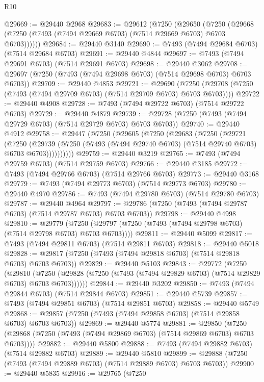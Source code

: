 \begin{lexlean}{R10}
\begin{coremodule}
@29669 := @29440 @2968
@29683 := @29612
    (@7250
      (@29650
        (@7250 (@29668 (@7250 (@7493 (@7494 @29669 @6703) (@7514 @29669 @6703) @6703 @6703))))))
@29684 := @29440 @3140
@29690 := @7493 (@7494 @29684 @6703) (@7514 @29684 @6703)
@29691 := @29440 @4844
@29697 := @7493 (@7494 @29691 @6703) (@7514 @29691 @6703)
@29698 := @29440 @3062
@29708 := @29697 (@7250 (@7493 (@7494 @29698 @6703) (@7514 @29698 @6703) @6703 @6703))
@29709 := @29440 @4853
@29721 := @29690
    (@7250 (@29708 (@7250 (@7493 (@7494 @29709 @6703) (@7514 @29709 @6703) @6703 @6703))))
@29722 := @29440 @4908
@29728 := @7493 (@7494 @29722 @6703) (@7514 @29722 @6703)
@29729 := @29440 @4879
@29739 := @29728 (@7250 (@7493 (@7494 @29729 @6703) (@7514 @29729 @6703) @6703 @6703))
@29740 := @29440 @4912
@29758 := @29447
    (@7250
      (@29605
        (@7250
          (@29683
            (@7250
              (@29721
                (@7250
                  (@29739
                    (@7250 (@7493 (@7494 @29740 @6703) (@7514 @29740 @6703) @6703 @6703))))))))))
@29759 := @29440 @3219
@29765 := @7493 (@7494 @29759 @6703) (@7514 @29759 @6703)
@29766 := @29440 @3185
@29772 := @7493 (@7494 @29766 @6703) (@7514 @29766 @6703)
@29773 := @29440 @3168
@29779 := @7493 (@7494 @29773 @6703) (@7514 @29773 @6703)
@29780 := @29440 @4970
@29786 := @7493 (@7494 @29780 @6703) (@7514 @29780 @6703)
@29787 := @29440 @4964
@29797 := @29786 (@7250 (@7493 (@7494 @29787 @6703) (@7514 @29787 @6703) @6703 @6703))
@29798 := @29440 @4998
@29810 := @29779
    (@7250 (@29797 (@7250 (@7493 (@7494 @29798 @6703) (@7514 @29798 @6703) @6703 @6703))))
@29811 := @29440 @5099
@29817 := @7493 (@7494 @29811 @6703) (@7514 @29811 @6703)
@29818 := @29440 @5018
@29828 := @29817 (@7250 (@7493 (@7494 @29818 @6703) (@7514 @29818 @6703) @6703 @6703))
@29829 := @29440 @5103
@29843 := @29772
    (@7250
      (@29810
        (@7250 (@29828 (@7250 (@7493 (@7494 @29829 @6703) (@7514 @29829 @6703) @6703 @6703))))))
@29844 := @29440 @3202
@29850 := @7493 (@7494 @29844 @6703) (@7514 @29844 @6703)
@29851 := @29440 @5739
@29857 := @7493 (@7494 @29851 @6703) (@7514 @29851 @6703)
@29858 := @29440 @5749
@29868 := @29857 (@7250 (@7493 (@7494 @29858 @6703) (@7514 @29858 @6703) @6703 @6703))
@29869 := @29440 @5774
@29881 := @29850
    (@7250 (@29868 (@7250 (@7493 (@7494 @29869 @6703) (@7514 @29869 @6703) @6703 @6703))))
@29882 := @29440 @5800
@29888 := @7493 (@7494 @29882 @6703) (@7514 @29882 @6703)
@29889 := @29440 @5810
@29899 := @29888 (@7250 (@7493 (@7494 @29889 @6703) (@7514 @29889 @6703) @6703 @6703))
@29900 := @29440 @5835
@29916 := @29765
    (@7250

\end{coremodule}
\end{lexlean}
